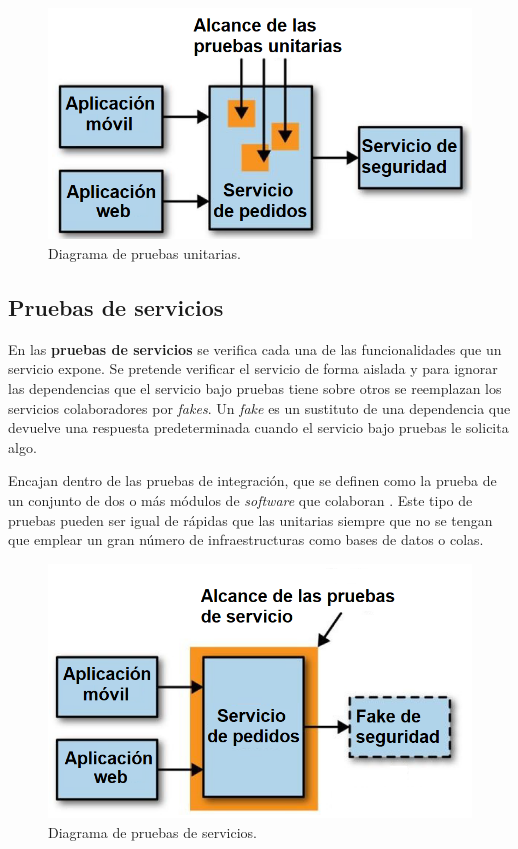 \documentclass[11pt,spanish,listoffigures]{tfgetsinf}
\begin{document}
\begin{figure}[h]
\centering
\includegraphics[scale=0.5]{Unit_Tests_ES}
\caption{Diagrama de pruebas unitarias.}
\end{figure}

\subsection{Pruebas de servicios}

En las \textbf{pruebas de servicios} se verifica cada una de las funcionalidades que un servicio expone. Se pretende verificar el servicio de forma aislada y para ignorar las dependencias que el servicio bajo pruebas tiene sobre otros se reemplazan los servicios colaboradores por \textit{fakes}. Un \textit{fake} es un sustituto  de una dependencia que devuelve una respuesta predeterminada cuando el servicio bajo pruebas le solicita algo.

Encajan dentro de las pruebas de integración, que se definen como la prueba de un conjunto de dos o más módulos de \textit{software} que colaboran \cite{Osherove2014}. Este tipo de pruebas pueden ser igual de rápidas que las unitarias siempre que no se tengan que emplear un gran número de infraestructuras como bases de datos o colas.

\begin{figure}[h]
\centering
\includegraphics[scale=0.5]{Service_Tests_ES}
\caption{Diagrama de pruebas de servicios.}
\end{figure}
\end{document}
